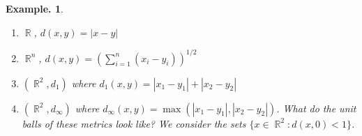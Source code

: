 \documentclass[11pt, a4paper]{memoir}
\DeclareMathOperator{\R}{{\mathbb{R}}}
\theoremstyle{change}
\theoremstyle{plain}
\theoremstyle{nonumberplain}
\newtheorem{example}{Example.}
\numberwithin{equation}{section}
\begin{document}
\begin{example}\hspace{1cm}
    \begin{enumerate}
        \item $\R$, $d(x,y)=|x-y|$
        \item $\R^n$, $d(x,y)=\left( \sum\limits_{i=1}^n(x_i-y_i) \right)^{1/2}$
        \item $(\R^2,d_1)$ where $d_1(x,y)=|x_1-y_1|+|x_2-y_2|$
        \item $(\R^2,d_\infty)$ where $d_\infty(x,y)=\max(|x_1-y_1|,|x_2-y_2|)$.
            What do the unit balls of these metrics look like? We consider the sets $\{x\in\R^2:d(x,0)<1\}$.
            \begin{center}
\end{center}
\end{enumerate}
\end{example}
\end{document}
